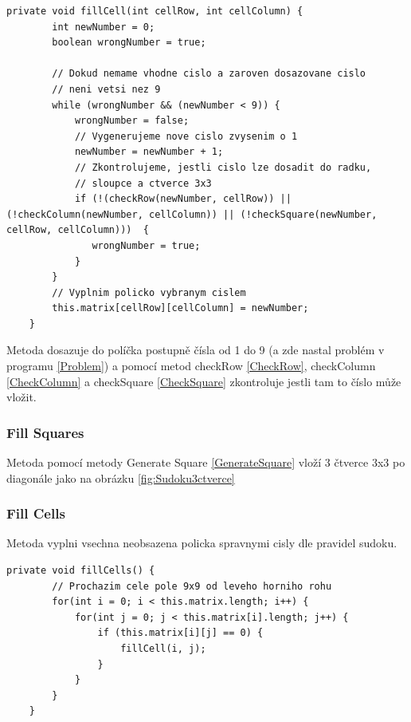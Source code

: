 \begin{small}
\begin{lstlisting}
private void fillCell(int cellRow, int cellColumn) {
        int newNumber = 0;
        boolean wrongNumber = true;

        // Dokud nemame vhodne cislo a zaroven dosazovane cislo
        // neni vetsi nez 9
        while (wrongNumber && (newNumber < 9)) {
            wrongNumber = false;
            // Vygenerujeme nove cislo zvysenim o 1
            newNumber = newNumber + 1;
            // Zkontrolujeme, jestli cislo lze dosadit do radku,
            // sloupce a ctverce 3x3
            if (!(checkRow(newNumber, cellRow)) || (!checkColumn(newNumber, cellColumn)) || (!checkSquare(newNumber, cellRow, cellColumn)))  {
               wrongNumber = true;
            }
        }
        // Vyplnim policko vybranym cislem
        this.matrix[cellRow][cellColumn] = newNumber;
    }
\end{lstlisting}
\end{small}

Metoda dosazuje do políčka postupně čísla od 1 do 9 (a zde nastal problém v programu \ref{Problem}) a pomocí metod checkRow \ref{CheckRow}, checkColumn \ref{CheckColumn} a checkSquare \ref{CheckSquare} zkontroluje jestli tam to číslo může vložit.

\label{FillSquares}\subsubsection{Fill Squares}
Metoda pomocí metody Generate Square \ref{GenerateSquare} vloží 3 čtverce 3x3 po diagonále jako na obrázku \ref{fig:Sudoku3ctverce}

\label{FillCells}\subsubsection{Fill Cells}
Metoda vyplni vsechna neobsazena policka spravnymi cisly dle pravidel sudoku.

\begin{small}
\begin{lstlisting}
private void fillCells() {
        // Prochazim cele pole 9x9 od leveho horniho rohu
        for(int i = 0; i < this.matrix.length; i++) {
            for(int j = 0; j < this.matrix[i].length; j++) {
                if (this.matrix[i][j] == 0) {
                    fillCell(i, j);
                }
            }
        }
    }
\end{lstlisting}
\end{small}

